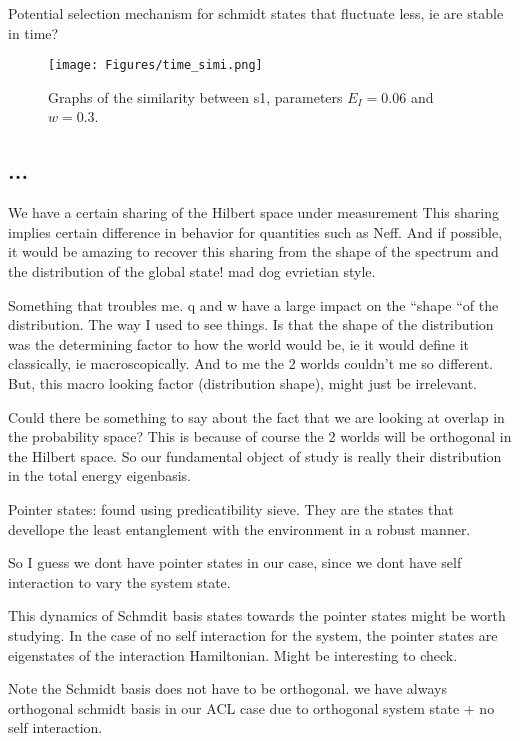 \documentclass{article}
\begin{document}
Potential selection mechanism for schmidt states that fluctuate less, ie are stable in time?


\begin{figure}
    \centering
    \texttt{[image: Figures/time\_simi.png]}
    \caption{Graphs of the similarity between s1, parameters $E_I=0.06$ and $w=0.3$.}
    \label{fig:time_simi}
\end{figure}

\subsection{...}

We have a certain sharing of the Hilbert space under measurement
This sharing implies certain difference in behavior for quantities such as Neff. And if possible, it would be amazing to recover this sharing from the shape of the spectrum and the distribution of the global state!  mad dog evrietian style.

Something that troubles me. q and w have a large impact on the  “shape “of the distribution. The way I used to see things. Is that the shape of the distribution was the determining factor to how the world would be, ie it would define it classically, ie macroscopically. And to me the 2 worlds couldn’t me so different. But, this macro looking factor (distribution shape), might just be irrelevant.  

Could there be something to say about the fact that we are looking at overlap in the probability space? This is because of course the 2 worlds will be orthogonal in the Hilbert space. 
So our fundamental object of study is really their distribution in the total energy eigenbasis.



Pointer states: found using predicatibility sieve. They are the states that devellope the least entanglement with the environment in a robust manner.

So I guess we dont have pointer states in our case, since we dont have self interaction to vary the system state.

This dynamics of Schmdit basis states towards the pointer states might be worth studying. In the case of no self interaction for the system, the pointer states are eigenstates of the interaction Hamiltonian. Might be interesting to check.

Note the Schmidt basis does not have to be orthogonal.  
we have always orthogonal schmidt basis in our ACL case due to orthogonal system state + no self interaction.
\end{document}

